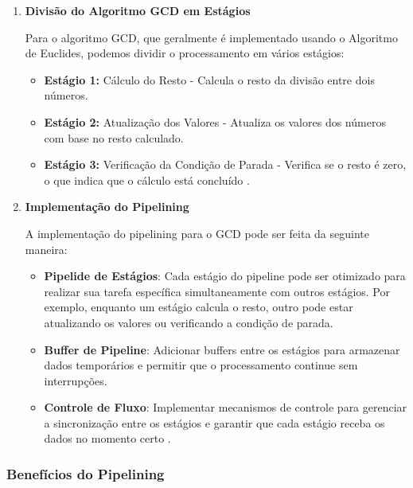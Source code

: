 \documentclass[a4paper,11pt]{article} %
\begin{document}
\begin{enumerate}
    \item \textbf{Divisão do Algoritmo GCD em Estágios}



Para o algoritmo GCD, que geralmente é implementado usando o Algoritmo de Euclides, podemos dividir o processamento em vários estágios:

\begin{itemize}
    \item \textbf{Estágio 1:} Cálculo do Resto - Calcula o resto da divisão entre dois números.
    \item \textbf{Estágio 2:} Atualização dos Valores - Atualiza os valores dos números com base no resto calculado.
    \item \textbf{Estágio 3:} Verificação da Condição de Parada - Verifica se o resto é zero, o que indica que o cálculo está concluído \cite{Knuth1997}.
\end{itemize}

 \item \textbf{Implementação do Pipelining}

A implementação do pipelining para o GCD pode ser feita da seguinte maneira:

\begin{itemize}
    \item \textbf{Pipelide de Estágios}: Cada estágio do pipeline pode ser otimizado para realizar sua tarefa específica simultaneamente com outros estágios. Por exemplo, enquanto um estágio calcula o resto, outro pode estar atualizando os valores ou verificando a condição de parada.
    \item \textbf{Buffer de Pipeline}: Adicionar buffers entre os estágios para armazenar dados temporários e permitir que o processamento continue sem interrupções.
    \item \textbf{Controle de Fluxo}: Implementar mecanismos de controle para gerenciar a sincronização entre os estágios e garantir que cada estágio receba os dados no momento certo \cite{Patterson2013}.
\end{itemize}

\end {enumerate}

\subsubsection{Benefícios do Pipelining}
\end{document}
